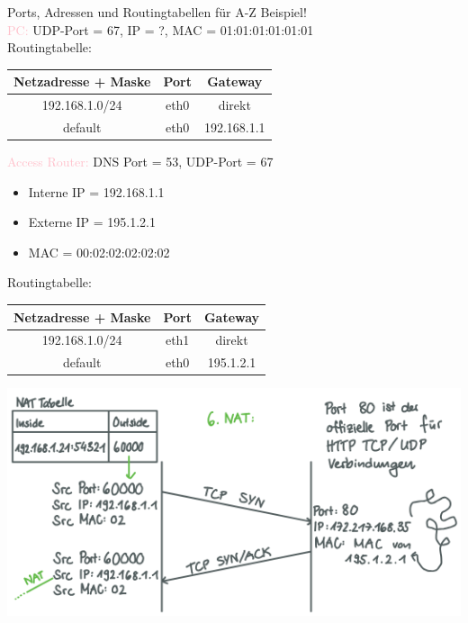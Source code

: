 \begin{example2}{Ports{,} Adressen und Routingtabellen} für A-Z Beispiel!\\
    \textcolor{pink}{PC:} UDP-Port = 67, IP = ?, MAC = 01:01:01:01:01:01\\
    Routingtabelle:\\
    \begin{tabular}{|c|c|c|}
        \hline
        Netzadresse + Maske & Port & Gateway\\
        \hline
        192.168.1.0/24 & eth0 & direkt\\
        \hline
        default & eth0 & 192.168.1.1\\
        \hline
    \end{tabular}

    \vspace{2mm}

    \textcolor{pink}{Access Router:} DNS Port = 53, UDP-Port = 67
    \begin{itemize}
        \item Interne IP = 192.168.1.1
        \item Externe IP = 195.1.2.1
        \item MAC = 00:02:02:02:02:02
    \end{itemize}
    Routingtabelle:\\
    \begin{tabular}{|c|c|c|}
        \hline
        Netzadresse + Maske & Port & Gateway\\
        \hline
        192.168.1.0/24 & eth1 & direkt\\
        \hline
        default & eth0 & 195.1.2.1\\
        \hline
    \end{tabular}

\end{example2}


\includegraphics[width=1\linewidth]{images/atoz3.png}




